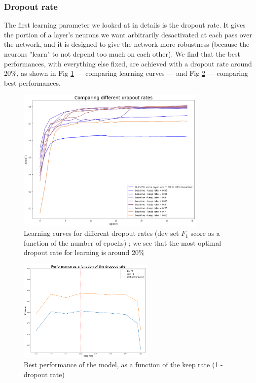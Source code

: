 \documentclass{article} %
\begin{document}
\subsubsection{Dropout rate}

The first learning parameter we looked at in details is the dropout rate. It gives the portion of a layer's neurons we want arbitrarily desactivated at each pass over the network, and it is designed to give the network more robustness (because the neurons "learn" to not depend too much on each other). We find that the best performances, with everything else fixed, are achieved with a dropout rate around 20\%, as shown in Fig \ref{dr_devf1} --- comparing learning curves --- and Fig \ref{dr_graph} --- comparing best performances.

\begin{figure}[h!!]
\begin{center}
\includegraphics[width=350px]{figs/dr_devf1.png}
\caption{Learning curves for different dropout rates (dev set $F_1$ score as a function of the number of epochs) ; we see that the most optimal dropout rate for learning is around 20\%}
\label{dr_devf1}
\end{center}
\end{figure}

\begin{figure}[h!]
\begin{center}
\includegraphics[width=250px]{figs/dr_graph.png}
\caption{Best performance of the model, as a function of the keep rate (1 - dropout rate)}
\label{dr_graph}
\end{center}
\end{figure}
\end{document}
